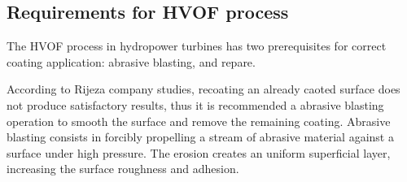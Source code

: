 \subsection{Requirements for HVOF process}

The HVOF process in hydropower turbines has two prerequisites for correct
coating application: abrasive blasting, and repare. %


According to Rijeza company studies, recoating an already caoted surface does
not produce satisfactory results, thus it is recommended a abrasive blasting operation to smooth the surface and remove the remaining
coating. Abrasive blasting consists in forcibly propelling a stream of abrasive
material against a surface under high pressure. The erosion creates an uniform
superficial layer, increasing the surface roughness and
adhesion.



